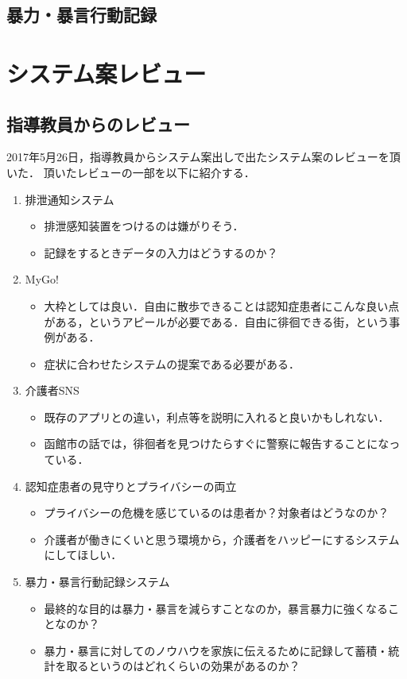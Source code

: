 \documentclass[../report]{subfiles}
\begin{document}
\subsection{暴力・暴言行動記録}



\section{システム案レビュー}
\subsection{指導教員からのレビュー}
2017年5月26日，指導教員からシステム案出しで出たシステム案のレビューを頂いた．
頂いたレビューの一部を以下に紹介する．
\begin{enumerate}
    \item 排泄通知システム
        \begin{itemize}
            \item 排泄感知装置をつけるのは嫌がりそう．
            \item 記録をするときデータの入力はどうするのか？
        \end{itemize}
    \item MyGo!
        \begin{itemize}
            \item 大枠としては良い．自由に散歩できることは認知症患者にこんな良い点がある，というアピールが必要である．自由に徘徊できる街，という事例がある\cite{haikai}．
            \item 症状に合わせたシステムの提案である必要がある．
        \end{itemize}
    \item 介護者SNS
        \begin{itemize}
            \item 既存のアプリとの違い，利点等を説明に入れると良いかもしれない．
            \item 函館市の話では，徘徊者を見つけたらすぐに警察に報告することになっている．
        \end{itemize}
    \item 認知症患者の見守りとプライバシーの両立
        \begin{itemize}
            \item プライバシーの危機を感じているのは患者か？対象者はどうなのか？
            \item 介護者が働きにくいと思う環境から，介護者をハッピーにするシステムにしてほしい．
        \end{itemize}
    \item 暴力・暴言行動記録システム
        \begin{itemize}
            \item 最終的な目的は暴力・暴言を減らすことなのか，暴言暴力に強くなることなのか？
            \item 暴力・暴言に対してのノウハウを家族に伝えるために記録して蓄積・統計を取るというのはどれくらいの効果があるのか？
        \end{itemize}
\end{enumerate}
\end{document}
